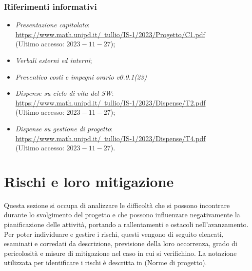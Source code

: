 \documentclass[10pt, a4paper]{article}
\begin{document}
\subsubsection{Riferimenti informativi}
\begin{itemize}
   
    \item \textit{Presentazione capitolato}:\\
    \href{https://www.math.unipd.it/~tullio/IS-1/2023/Progetto/C1.pdf}{https://www.math.unipd.it/~tullio/IS-1/2023/Progetto/C1.pdf}\\
    (Ultimo accesso: $2023-11-27$);   
    
    \item \textit{Verbali esterni ed interni};
    \item \textit{Preventivo costi e impegni orario v0.0.1(23)}
    
    \item \textit{Dispense su ciclo di vita del SW}:\\
    \href{https://www.math.unipd.it/~tullio/IS-1/2023/Dispense/T2.pdf}{https://www.math.unipd.it/~tullio/IS-1/2023/Dispense/T2.pdf}\\
    (Ultimo accesso: $2023-11-27$);
    
    \item  \textit{Dispense su gestione di progetto}:\\
    \href{https://www.math.unipd.it/~tullio/IS-1/2023/Dispense/T4.pdf}{https://www.math.unipd.it/~tullio/IS-1/2023/Dispense/T4.pdf}\\
    (Ultimo accesso: $2023-11-27$).
\end{itemize}

\newpage

\section{Rischi e loro mitigazione}
\label{section:Rischi}
\paragraph{}Questa sezione si occupa di analizzare le difficoltà che si possono incontrare durante lo svolgimento del progetto e che possono influenzare negativamente la pianificazione delle attività, portando a rallentamenti e ostacoli nell'avanzamento.\\
Per poter individuare e gestire i rischi, questi vengono di seguito elencati, esaminati e corredati da descrizione, previsione della loro occorrenza, grado di pericolosità e misure di mitigazione nel caso in cui si verifichino.
La notazione utilizzata per identificare i rischi è descritta in (Norme di progetto).
\end{document}
